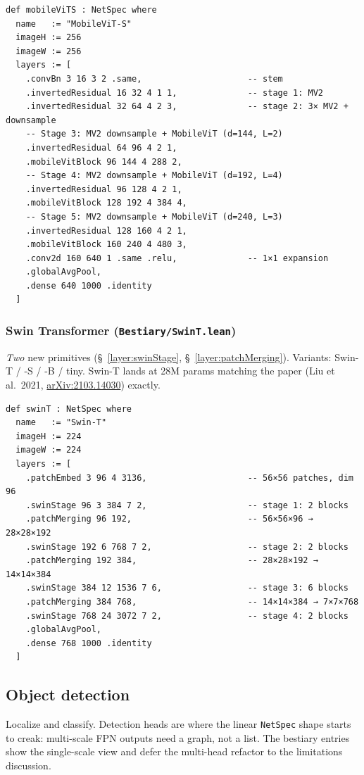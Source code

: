 \begin{verbatim}
def mobileViTS : NetSpec where
  name   := "MobileViT-S"
  imageH := 256
  imageW := 256
  layers := [
    .convBn 3 16 3 2 .same,                     -- stem
    .invertedResidual 16 32 4 1 1,              -- stage 1: MV2
    .invertedResidual 32 64 4 2 3,              -- stage 2: 3× MV2 + downsample
    -- Stage 3: MV2 downsample + MobileViT (d=144, L=2)
    .invertedResidual 64 96 4 2 1,
    .mobileVitBlock 96 144 4 288 2,
    -- Stage 4: MV2 downsample + MobileViT (d=192, L=4)
    .invertedResidual 96 128 4 2 1,
    .mobileVitBlock 128 192 4 384 4,
    -- Stage 5: MV2 downsample + MobileViT (d=240, L=3)
    .invertedResidual 128 160 4 2 1,
    .mobileVitBlock 160 240 4 480 3,
    .conv2d 160 640 1 .same .relu,              -- 1×1 expansion
    .globalAvgPool,
    .dense 640 1000 .identity
  ]
\end{verbatim}

\subsubsection*{Swin Transformer (\texttt{Bestiary/SwinT.lean})}
\emph{Two} new primitives (\S~\ref{layer:swinStage},
\S~\ref{layer:patchMerging}). Variants: Swin-T / -S / -B / tiny.
Swin-T lands at 28M params matching the paper (Liu et al.\ 2021,
\href{https://arxiv.org/abs/2103.14030}{arXiv:2103.14030}) exactly.

\begin{verbatim}
def swinT : NetSpec where
  name   := "Swin-T"
  imageH := 224
  imageW := 224
  layers := [
    .patchEmbed 3 96 4 3136,                    -- 56×56 patches, dim 96
    .swinStage 96 3 384 7 2,                    -- stage 1: 2 blocks
    .patchMerging 96 192,                       -- 56×56×96 → 28×28×192
    .swinStage 192 6 768 7 2,                   -- stage 2: 2 blocks
    .patchMerging 192 384,                      -- 28×28×192 → 14×14×384
    .swinStage 384 12 1536 7 6,                 -- stage 3: 6 blocks
    .patchMerging 384 768,                      -- 14×14×384 → 7×7×768
    .swinStage 768 24 3072 7 2,                 -- stage 4: 2 blocks
    .globalAvgPool,
    .dense 768 1000 .identity
  ]
\end{verbatim}

\subsection{Object detection}

Localize and classify. Detection heads are where the linear
\texttt{NetSpec} shape starts to creak: multi-scale FPN outputs need a
graph, not a list. The bestiary entries show the single-scale view and
defer the multi-head refactor to the limitations discussion.

